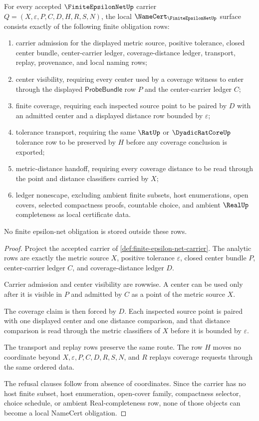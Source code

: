 \begin{theorem}
\label{thm:finite-epsilon-net-namecert-obligations}
For every accepted $\FiniteEpsilonNetUp$ carrier $Q=(X,\varepsilon,P,C,D,H,R,S,N)$, the local $\NameCert_{\FiniteEpsilonNetUp}$ surface consists exactly of the following finite obligation rows:
\begin{enumerate}
\item carrier admission for the displayed metric source, positive tolerance, closed center bundle, center-carrier ledger, coverage-distance ledger, transport, replay, provenance, and local naming rows;
\item center visibility, requiring every center used by a coverage witness to enter through the displayed $\mathsf{ProbeBundle}$ row $P$ and the center-carrier ledger $C$;
\item finite coverage, requiring each inspected source point to be paired by $D$ with an admitted center and a displayed distance row bounded by $\varepsilon$;
\item tolerance transport, requiring the same $\RatUp$ or $\DyadicRatCoreUp$ tolerance row to be preserved by $H$ before any coverage conclusion is exported;
\item metric-distance handoff, requiring every coverage distance to be read through the point and distance classifiers carried by $X$;
\item ledger nonescape, excluding ambient finite subsets, host enumerations, open covers, selected compactness proofs, countable choice, and ambient $\RealUp$ completeness as local certificate data.
\end{enumerate}
No finite epsilon-net obligation is stored outside these rows.
\end{theorem}
\begin{proof}
Project the accepted carrier of \autoref{def:finite-epsilon-net-carrier}. The analytic rows are exactly the metric source $X$, positive tolerance $\varepsilon$, closed center bundle $P$, center-carrier ledger $C$, and coverage-distance ledger $D$.

Carrier admission and center visibility are rowwise. A center can be used only after it is visible in $P$ and admitted by $C$ as a point of the metric source $X$.

The coverage claim is then forced by $D$. Each inspected source point is paired with one displayed center and one distance comparison, and that distance comparison is read through the metric classifiers of $X$ before it is bounded by $\varepsilon$.

The transport and replay rows preserve the same route. The row $H$ moves no coordinate beyond $X,\varepsilon,P,C,D,R,S,N$, and $R$ replays coverage requests through the same ordered data.

The refusal clauses follow from absence of coordinates. Since the carrier has no host finite subset, host enumeration, open-cover family, compactness selector, choice schedule, or ambient Real-completeness row, none of those objects can become a local NameCert obligation.
\end{proof}

